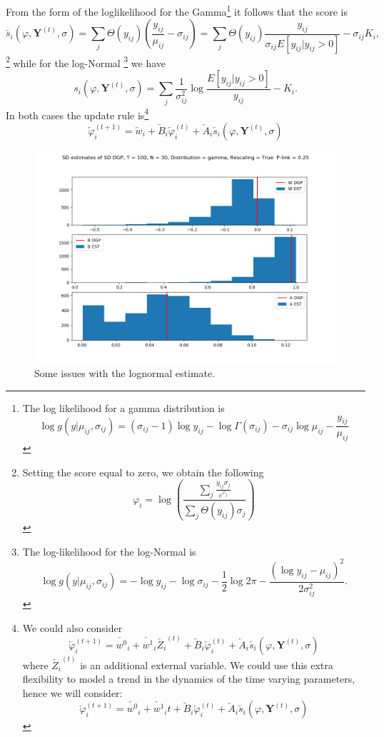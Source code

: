 \documentclass[a4paper,12pt]{article}
\newcommand{\tonde}[1]{\left(#1\right)}
\newcommand{\pt}[1]{\left(#1\right)}
\newcommand{\quadre}[1]{\left[#1\right]}
\newcommand{\be}{\begin{equation}}
\newcommand{\ee}{\end{equation}}
\newcommand{\Yt}{{\mathbf{Y}^{\tonde{t}}}}
\newcommand{\et}{^{\tonde{t}}}
\newcommand{\uij}{_{ij}}
\newcommand{\etp}{^{\tonde{t+1}}}
\newcommand{\wpar}{\varphi}
\newcommand{\iwpar}{{\overleftarrow{\wpar}}}
\newcommand{\owpar}{{\overrightarrow{\wpar}}}
\newcommand{\inpar}[1]{ {\overleftarrow{#1}}}
\begin{document}
From the form of the loglikelihood for the Gamma\footnote{The log likelihood for a gamma distribution is $$ \log g\pt{y \vert \mu\uij , \sigma\uij }  =  \pt{\sigma\uij-1} \log y\uij - \log{\Gamma\pt{\sigma\uij}}   - \sigma\uij \log{\mu\uij}  - \frac{y\uij}{\mu\uij} $$} it follows that the score is
\be
 \overleftarrow{s_i}\pt{\varphi,\Yt,\sigma}  %
= \sum_j   \Theta\tonde{y\uij}  \pt{\frac{y\uij}{\mu\uij} - \sigma\uij}  = \sum_j  \Theta\tonde{y\uij} \frac{y\uij}{\sigma\uij E\quadre{y\uij\vert y\uij>0}}  -  \sigma\uij K_i ,
\ee\footnote{Setting the score equal to zero, we obtain the following $$ \varphi_i = \log\pt{\frac{\sum_j \frac{y\uij \sigma_j}{e^{\varphi_j}}}{\sum_j \Theta\pt{y\uij} \sigma_j }}$$}
while for the log-Normal \footnote{The log-likelihood for the log-Normal is $$ \log g\pt{y \vert \mu\uij , \sigma\uij }  = - \log y\uij -\log \sigma\uij - \frac{1}{2} \log 2 \pi - \frac{\tonde{\log y\uij - \mu\uij }^2}{2 \sigma\uij^2}  .$$} we have
\be
 s_i\pt{\varphi,\Yt,\sigma}%
 = \sum_j \frac{1}{\sigma\uij^2} \log\frac{E\quadre{y\uij\vert y\uij>0}}{y\uij}   -  K_i .
\ee
In both cases the update rule is\footnote{We could also consider \be
	\iwpar_i\etp = \inpar{w^0}_i +  \inpar{w^1}_i   \inpar{Z_i}\et +  \inpar{B}_i \iwpar_i\et  +   \inpar{A}_i  \overleftarrow{s_i}\pt{\varphi,\Yt,\sigma}  
	\ee where $\inpar{Z_i}\et $ is an additional external variable. We could use this extra flexibility to model a trend in the dynamics of the time varying parameters, hence we will consider:
	\be
	\iwpar_i\etp = \inpar{w^0}_i +  \inpar{w^1}_i   t +  \inpar{B}_i \iwpar_i\et  +   \inpar{A}_i  \overleftarrow{s_i}\pt{\varphi,\Yt,\sigma}  
	\ee}
\be
\iwpar_i\etp = \inpar{w}_i +  \inpar{B}_i \iwpar_i\et  +   \inpar{A}_i  \overleftarrow{s_i}\pt{\varphi,\Yt,\sigma}  
\ee
\begin{figure}[h]
	\includegraphics[width=0.95\linewidth 	]{./figures/static_SD_par_est_gamma_resc_p_0_9.png}
	\caption{Some issues with the lognormal estimate. }
\end{figure}
\end{document}
